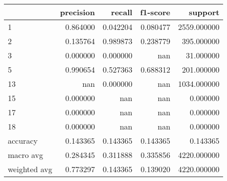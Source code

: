 \begin{tabular}{lrrrr}
\toprule
 & precision & recall & f1-score & support \\
\midrule
1 & 0.864000 & 0.042204 & 0.080477 & 2559.000000 \\
2 & 0.135764 & 0.989873 & 0.238779 & 395.000000 \\
3 & 0.000000 & 0.000000 & nan & 31.000000 \\
5 & 0.990654 & 0.527363 & 0.688312 & 201.000000 \\
13 & nan & 0.000000 & nan & 1034.000000 \\
15 & 0.000000 & nan & nan & 0.000000 \\
17 & 0.000000 & nan & nan & 0.000000 \\
18 & 0.000000 & nan & nan & 0.000000 \\
accuracy & 0.143365 & 0.143365 & 0.143365 & 0.143365 \\
macro avg & 0.284345 & 0.311888 & 0.335856 & 4220.000000 \\
weighted avg & 0.773297 & 0.143365 & 0.139020 & 4220.000000 \\
\bottomrule
\end{tabular}
